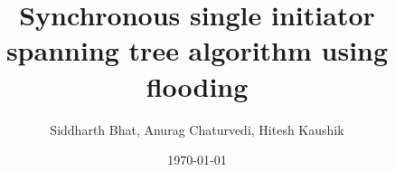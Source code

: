 \documentclass{beamer}
\title{Synchronous single initiator spanning tree algorithm using flooding}
\author{Siddharth Bhat, Anurag Chaturvedi, Hitesh Kaushik}
\date{\today}
\begin{document}
\begin{frame}
\titlepage
\end{frame}

\begin{frame}
\end{frame}

\begin{frame}
\end{frame}

\begin{frame}
\end{frame}

\begin{frame}
\end{frame}

\begin{frame}
\end{frame}


\begin{frame}
\end{frame}
\end{document}
